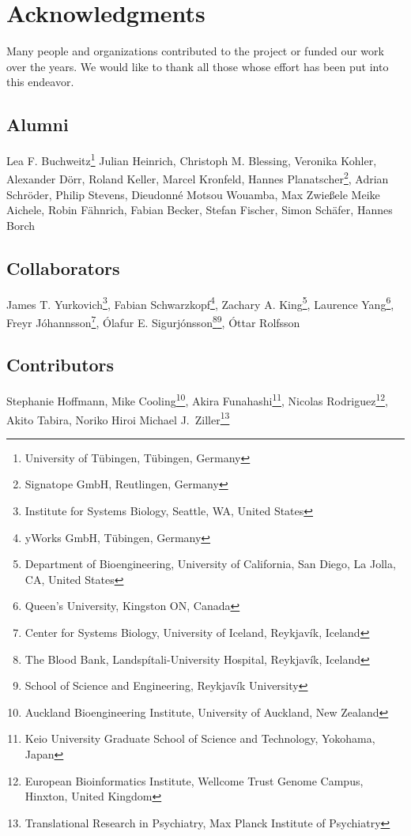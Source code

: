 \chapter{Acknowledgments}

Many people and organizations contributed to the project or funded our work over the years.
We would like to thank all those whose effort has been put into this endeavor.

\section{Alumni}

Lea F. Buchweitz\footnote{University of T\"ubingen, T\"ubingen, Germany\label{fn:zbit}}
Julian Heinrich,
Christoph M. Blessing,
Veronika Kohler,
Alexander D\"orr,
Roland Keller,
Marcel Kronfeld, 
Hannes Planatscher\footnote{Signatope GmbH, Reutlingen, Germany},
Adrian Schr\"oder,
Philip Stevens,
Dieu\-donn\'e Motsou Wouamba,
Max Zwie\ss{}ele
Meike Aichele,
Robin Fähnrich,
Fabian Becker,
Stefan Fischer,
Simon Sch\"afer,
Hannes Borch

\section{Collaborators}

James T. Yurkovich\footnote{Institute for Systems Biology, Seattle, WA, United States},
Fabian Schwarzkopf\footnote{yWorks GmbH, T\"ubingen, Germany},
Zachary A. King\footnote{Department of Bioengineering, University of California, San Diego, La Jolla, CA, United States\label{fn:ucsd}},
Laurence Yang\footnote{Queen’s University, Kingston ON, Canada},
Freyr J\'ohannsson\footnote{Center for Systems Biology, University of Iceland, Reykjav\'ik, Iceland\label{fn:csbiceland}},
\'Olafur E. Sigurj\'onsson\footnote{The Blood Bank, Landsp\'itali-University Hospital, Reykjav\'ik, Iceland}\footnote{School of Science and Engineering, Reykjav\'ik University},
\'Ottar Rolfsson

\section{Contributors}

Stephanie Hoffmann,
Mike Cooling\footnote{Auckland Bioengineering Institute, University of Auckland, New Zealand\label{fn:auckland}},
Akira Funahashi\footnote{Keio University Graduate School of Science and Technology, Yokohama, Japan\label{fn:keio}},
Nicolas Rodriguez\footnote{European Bioinformatics Institute, Wellcome Trust Genome Campus, Hinxton, United Kingdom\label{fn:ebi}},
Akito Tabira, Noriko Hiroi
Michael J.~Ziller\footnote{Translational Research in Psychiatry, Max Planck Institute of Psychiatry}

